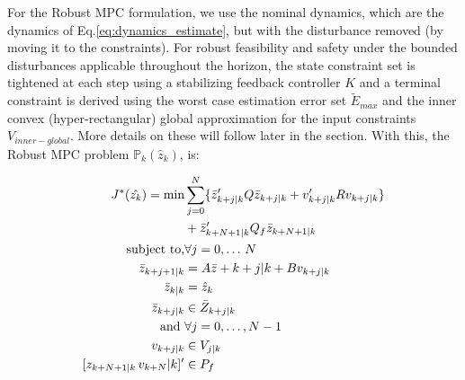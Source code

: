 For the Robust MPC formulation, we use the nominal dynamics, which are the dynamics of Eq.\ref{eq:dynamics_estimate}, but with the disturbance removed (by moving it to the constraints). For robust feasibility and safety under the bounded disturbances applicable throughout the horizon, the state constraint set is tightened at each step using a stabilizing feedback controller $K$ and a terminal constraint is derived using the worst case estimation error set $\tilde{E}_{max}$ and the inner convex (hyper-rectangular) global approximation for the input constraints $V_{inner-global}$. More details on these will follow later in the section.
With this, the Robust MPC problem $\mathbb{P}_k(\hat{z}_k)$, is:

\begin{subequations} \label{eq:RMPC}
\begin{align}
J^{*}(\hat{z_k}) = \text{min} &\sum_{j=0}^{N}\lbrace\bar{z}_{k+j|k}'Q\bar{z}_{k+j|k} + {v}_{k+j|k}'R{v}_{k+j|k}\rbrace \nonumber \\ 
&+ \bar{z}_{k+N+1|k}'Q_f\bar{z}_{k+N+1|k} \label{eq:cost} \\
\text{subject to,} &\forall j=0,\dotsc\,N \nonumber \\
\bar{z}_{k+j+1|k}&=A\bar{z}+{k+j|k} + Bv_{k+j|k} \label{eq:nom_dyn} \\
\bar{z}_{k|k} &= \hat{z}_{k} \label{eq:init_cond}\\
\bar{z}_{k+j|k}& \in \bar{Z}_{k+j|k} \label{eq:states_con}\\
\text{and } &\forall j=0,\dotsc,N-1 \nonumber \\
v_{k+j|k} & \in V_{j|k} \label{eq:input_con} \\
[z_{k+N+1|k} \, v_{k+N}|k]' & \in P_f \label{eq:joint_term} 
\end{align}
\end{subequations}

